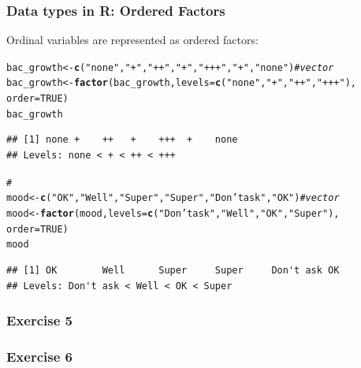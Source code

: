 \documentclass{beamer}\usepackage[]{graphicx}\usepackage[]{color}
\makeatletter
\newcommand{\hlnum}[1]{\textcolor[rgb]{0.686,0.059,0.569}{#1}}%
\newcommand{\hlstr}[1]{\textcolor[rgb]{0.192,0.494,0.8}{#1}}%
\newcommand{\hlcom}[1]{\textcolor[rgb]{0.678,0.584,0.686}{\textit{#1}}}%
\newcommand{\hlstd}[1]{\textcolor[rgb]{0.345,0.345,0.345}{#1}}%
\newcommand{\hlkwb}[1]{\textcolor[rgb]{0.69,0.353,0.396}{#1}}%
\newcommand{\hlkwc}[1]{\textcolor[rgb]{0.333,0.667,0.333}{#1}}%
\newcommand{\hlkwd}[1]{\textcolor[rgb]{0.737,0.353,0.396}{\textbf{#1}}}%
\newenvironment{kframe}{%
 \def\at@end@of@kframe{}%
 \ifinner\ifhmode%
  \def\at@end@of@kframe{\end{minipage}}%
  \begin{minipage}{\columnwidth}%
 \fi\fi%
 \def\FrameCommand##1{\hskip\@totalleftmargin \hskip-\fboxsep
 \colorbox{shadecolor}{##1}\hskip-\fboxsep
     \hskip-\linewidth \hskip-\@totalleftmargin \hskip\columnwidth}%
 \MakeFramed {\advance\hsize-\width
   \@totalleftmargin\z@ \linewidth\hsize
   \@setminipage}}%
 {\par\unskip\endMakeFramed%
 \at@end@of@kframe}
\newenvironment{knitrout}{}{} %
\makeatother
\begin{document}
{{{\begin{frame}[fragile]
\frametitle{Data types in R: Ordered Factors}
Ordinal variables are represented as ordered factors:
\begin{knitrout}\scriptsize
{}\color{fgcolor}\begin{kframe}
\begin{alltt}
\hlstd{bac_growth} \hlkwb{<-} \hlkwd{c}\hlstd{(}\hlstr{"none"}\hlstd{,} \hlstr{"+"}\hlstd{,} \hlstr{"++"}\hlstd{,} \hlstr{"+"}\hlstd{,} \hlstr{"+++"}\hlstd{,} \hlstr{"+"}\hlstd{,} \hlstr{"none"}\hlstd{)} \hlcom{# vector}
\hlstd{bac_growth} \hlkwb{<-} \hlkwd{factor}\hlstd{(bac_growth,} \hlkwc{levels} \hlstd{=} \hlkwd{c}\hlstd{(}\hlstr{"none"}\hlstd{,} \hlstr{"+"}\hlstd{,} \hlstr{"++"}\hlstd{,} \hlstr{"+++"}\hlstd{),}
               \hlkwc{order} \hlstd{=} \hlnum{TRUE}\hlstd{)}
\hlstd{bac_growth}
\end{alltt}
\begin{verbatim}
## [1] none +    ++   +    +++  +    none
## Levels: none < + < ++ < +++
\end{verbatim}
\begin{alltt}
\hlcom{#}
\hlstd{mood} \hlkwb{<-} \hlkwd{c}\hlstd{(}\hlstr{"OK"}\hlstd{,} \hlstr{"Well"}\hlstd{,} \hlstr{"Super"}\hlstd{,} \hlstr{"Super"}\hlstd{,} \hlstr{"Don't ask"}\hlstd{,} \hlstr{"OK"}\hlstd{)} \hlcom{# vector}
\hlstd{mood} \hlkwb{<-} \hlkwd{factor}\hlstd{(mood,} \hlkwc{levels} \hlstd{=} \hlkwd{c}\hlstd{(}\hlstr{"Don't ask"}\hlstd{,} \hlstr{"Well"}\hlstd{,} \hlstr{"OK"}\hlstd{,} \hlstr{"Super"}\hlstd{),}
               \hlkwc{order} \hlstd{=} \hlnum{TRUE}\hlstd{)}
\hlstd{mood}
\end{alltt}
\begin{verbatim}
## [1] OK        Well      Super     Super     Don't ask OK       
## Levels: Don't ask < Well < OK < Super
\end{verbatim}
\end{kframe}
\end{knitrout}
\end{frame}


\begin{frame}[fragile]
\frametitle{Exercise 5}
\end{frame}


\begin{frame}[fragile]
\frametitle{Exercise 6}
\end{frame}

}}}
\end{document}
